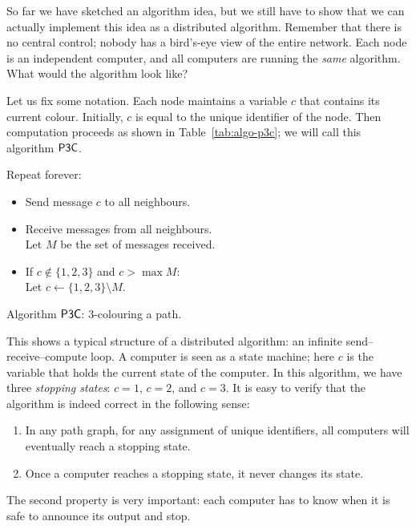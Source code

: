 So far we have sketched an algorithm idea, but we still have to show that we can actually implement this idea as a distributed algorithm. Remember that there is no central control; nobody has a bird's-eye view of the entire network. Each node is an independent computer, and all computers are running the \emph{same} algorithm. What would the algorithm look like?

Let us fix some notation. Each node maintains a variable $c$ that contains its current colour. Initially, $c$ is equal to the unique identifier of the node. Then computation proceeds as shown in Table~\ref{tab:algo-p3c}; we will call this algorithm $\textup{\sffamily P3C}$.

\begin{table}
    \raggedright
    \algtoprule
    \begin{descriptionb}
        \item[Repeat forever:] \mbox{}
        \begin{itemize}
            \item Send message $c$ to all neighbours.
            \item Receive messages from all neighbours. \\
                  Let $M$ be the set of messages received.
            \item If $c \notin \{1,2,3\}$ and $c > \max M$: \\
                  Let $c \gets \{1,2,3\} \setminus M$.
        \end{itemize}
    \end{descriptionb}
    \algbottomrule
    \caption{Algorithm $\textup{\sffamily P3C}$: $3$-colouring a path.}\label{tab:algo-p3c}
\end{table}

This shows a typical structure of a distributed algorithm: an infinite send--receive--compute loop. A computer is seen as a state machine; here $c$ is the variable that holds the current state of the computer. In this algorithm, we have three \emph{stopping states}: $c = 1$, $c = 2$, and $c = 3$. It is easy to verify that the algorithm is indeed correct in the following sense:
\begin{enumerate}
    \item In any path graph, for any assignment of unique identifiers, all computers will eventually reach a stopping state.
    \item Once a computer reaches a stopping state, it never changes its state.
\end{enumerate}
The second property is very important: each computer has to know when it is safe to announce its output and stop.

